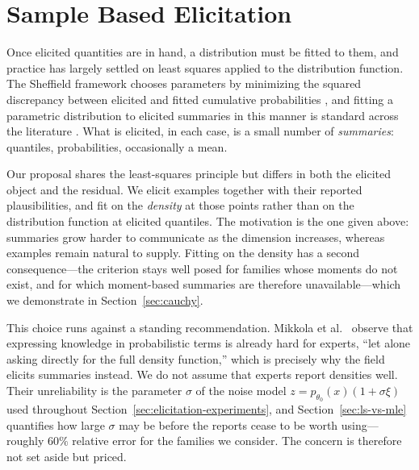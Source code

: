 \section{Sample Based Elicitation}
\label{sec:sample-based}

Once elicited quantities are in hand, a distribution must be fitted to them, and practice has largely settled on least squares applied to the distribution function. The Sheffield framework chooses parameters by minimizing the squared discrepancy between elicited and fitted cumulative probabilities \cite{OakleyOHagan2019}, and fitting a parametric distribution to elicited summaries in this manner is standard across the literature \cite{Garthwaite2005,OHagan2006}. What is elicited, in each case, is a small number of \emph{summaries}: quantiles, probabilities, occasionally a mean.

Our proposal shares the least-squares principle but differs in both the elicited object and the residual. We elicit examples together with their reported plausibilities, and fit on the \emph{density} at those points rather than on the distribution function at elicited quantiles. The motivation is the one given above: summaries grow harder to communicate as the dimension increases, whereas examples remain natural to supply. Fitting on the density has a second consequence---the criterion stays well posed for families whose moments do not exist, and for which moment-based summaries are therefore unavailable---which we demonstrate in Section~\ref{sec:cauchy}.

This choice runs against a standing recommendation. Mikkola et al.\ \cite{Mikkola2023} observe that expressing knowledge in probabilistic terms is already hard for experts, ``let alone asking directly for the full density function,'' which is precisely why the field elicits summaries instead. We do not assume that experts report densities well. Their unreliability is the parameter $\sigma$ of the noise model $z=p_{\theta_0}(x)(1+\sigma\xi)$ used throughout Section~\ref{sec:elicitation-experiments}, and Section~\ref{sec:ls-vs-mle} quantifies how large $\sigma$ may be before the reports cease to be worth using---roughly $60\%$ relative error for the families we consider. The concern is therefore not set aside but priced.

